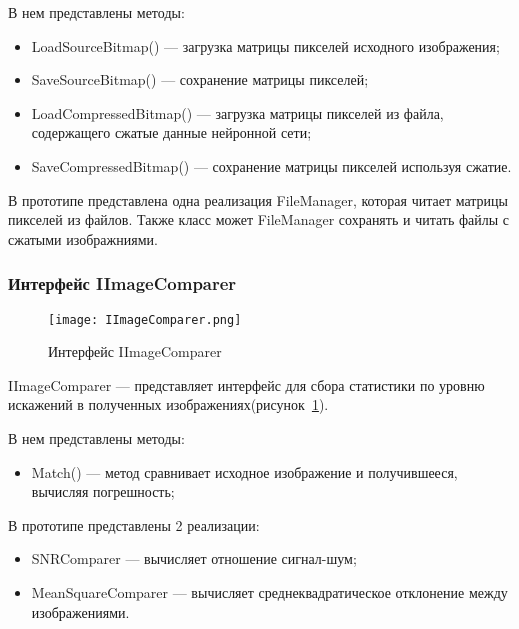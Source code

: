 В нем представлены методы:
\begin{itemize}
  \item LoadSourceBitmap() --- загрузка матрицы пикселей исходного изображения;
  \item SaveSourceBitmap() --- сохранение матрицы пикселей;
  \item LoadCompressedBitmap() --- загрузка матрицы пикселей из файла, содержащего сжатые данные нейронной сети;
  \item SaveCompressedBitmap() --- сохранение матрицы пикселей используя сжатие.
\end{itemize}

В прототипе представлена одна реализация FileManager, которая читает матрицы пикселей из файлов.
Также класс может FileManager сохранять и читать файлы с сжатыми изображниями.

\subsubsection{Интерфейс IImageComparer}
\label{subsub:development:types:iimagecomparer}

\begin{figure}[ht]
\centering
  \texttt{[image: IImageComparer.png]}
  \caption{ Интерфейс IImageComparer }
  \label{fig:iimagecomparer}
\end{figure}
IImageComparer --- представляет интерфейс для сбора статистики по уровню искажений в полученных изображениях(рисунок~\ref{fig:iimagecomparer}).

В нем представлены методы:
\begin{itemize}
  \item Match() --- метод сравнивает исходное изображение и получившееся, вычисляя погрешность;
\end{itemize}

В прототипе представлены 2 реализации:
\begin{itemize}
  \item SNRComparer --- вычисляет отношение сигнал-шум;
  \item MeanSquareComparer --- вычисляет среднеквадратическое отклонение между изображениями.
\end{itemize}
